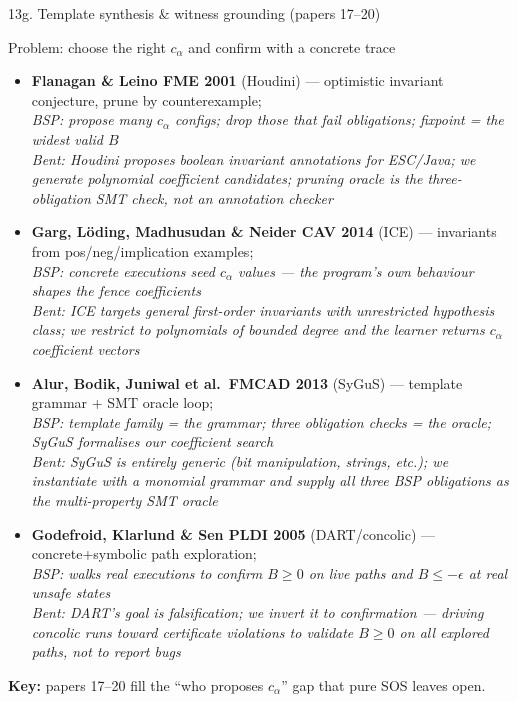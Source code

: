 \documentclass[aspectratio=169]{beamer}
\begin{document}
\begin{frame}[shrink=48]{13g. Template synthesis \& witness grounding (papers 17--20)}
\begin{block}{Problem: choose the right \(c_\alpha\) and confirm with a concrete trace}
\end{block}
\begin{itemize}
  \item \textbf{Flanagan \& Leino FME 2001} (Houdini) --- optimistic invariant conjecture, prune by counterexample;\\
    \textcolor{blue!75!black}{\textit{BSP: propose many \(c_\alpha\) configs; drop those that fail obligations; fixpoint = the widest valid \(B\)}}\\
    \textcolor{orange!80!black}{\textit{Bent: Houdini proposes boolean invariant \emph{annotations} for ESC/Java; we generate polynomial \emph{coefficient} candidates; pruning oracle is the three-obligation SMT check, not an annotation checker}}
  \item \textbf{Garg, L\"oding, Madhusudan \& Neider CAV 2014} (ICE) --- invariants from pos/neg/implication examples;\\
    \textcolor{blue!75!black}{\textit{BSP: concrete executions seed \(c_\alpha\) values --- the program's own behaviour shapes the fence coefficients}}\\
    \textcolor{orange!80!black}{\textit{Bent: ICE targets general first-order invariants with unrestricted hypothesis class; we restrict to polynomials of bounded degree and the learner returns \(c_\alpha\) coefficient vectors}}
  \item \textbf{Alur, Bodik, Juniwal et al.~FMCAD 2013} (SyGuS) --- template grammar + SMT oracle loop;\\
    \textcolor{blue!75!black}{\textit{BSP: template family = the grammar; three obligation checks = the oracle; SyGuS formalises our coefficient search}}\\
    \textcolor{orange!80!black}{\textit{Bent: SyGuS is entirely generic (bit manipulation, strings, etc.); we instantiate with a monomial grammar and supply all three BSP obligations as the multi-property SMT oracle}}
  \item \textbf{Godefroid, Klarlund \& Sen PLDI 2005} (DART/concolic) --- concrete+symbolic path exploration;\\
    \textcolor{blue!75!black}{\textit{BSP: walks real executions to confirm \(B\ge0\) on live paths and \(B\le{-}\epsilon\) at real unsafe states}}\\
    \textcolor{orange!80!black}{\textit{Bent: DART's goal is \emph{falsification}; we \emph{invert} it to \emph{confirmation} --- driving concolic runs toward certificate violations to validate \(B\ge0\) on all explored paths, not to report bugs}}
\end{itemize}
\textbf{Key:} papers 17--20 fill the ``who proposes \(c_\alpha\)'' gap that pure SOS leaves open.
\end{frame}
\end{document}
